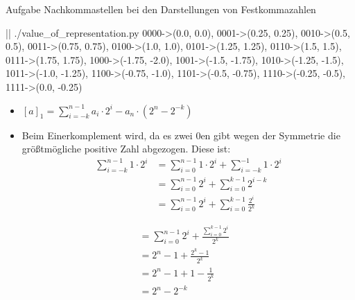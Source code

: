 \begin{frame}{Aufgabe \thesection}{Nachkommastellen bei den Darstellungen von Festkommazahlen\vspace{0.5cm}}
    \begin{requirementsnoinc}
    \end{requirementsnoinc}
    \begin{requirementsnoinc}
        \begin{terminal}
            |\prompt| ./value_of_representation.py
            {0000->(0.0, 0.0), 0001->(0.25, 0.25), 0010->(0.5, 0.5), 0011->(0.75, 0.75), 0100->(1.0, 1.0), 0101->(1.25, 1.25), 
            0110->(1.5, 1.5), 0111->(1.75, 1.75),  1000->(-1.75, -2.0), 1001->(-1.5, -1.75), 1010->(-1.25, -1.5), 
            1011->(-1.0, -1.25), 1100->(-0.75, -1.0), 1101->(-0.5, -0.75), 1110->(-0.25, -0.5), 1111->(0.0, -0.25)}        
        \end{terminal}
    \end{requirementsnoinc}

    \begin{solutionnoinc}
        \begin{itemize}
            \item $\displaystyle[a]_{1}=\textstyle{\sum_{i=-k}^{n-1}a_{i}\cdot2^{i}-a_{n}\cdot(2^{n}-2^{-k})}$
            \item Beim \alert{Einerkomplement} wird, da es zwei $0$en gibt wegen der Symmetrie die größtmögliche positive Zahl abgezogen. Diese ist: 
            \begin{align*}
            \sum_{i=-k}^{n-1}1\cdot2^{i} &= \sum_{i=0}^{n-1}1\cdot2^{i} + \sum_{i=-k}^{-1}1\cdot2^{i} \\
            &= \sum_{i=0}^{n-1}2^{i} + \sum_{i=0}^{k-1} 2^{i-k}\\
            &= \sum_{i=0}^{n-1}2^{i} + \sum_{i=0}^{k-1} \frac{2^{i}}{2^k}
            \end{align*}
        \end{itemize}
    \end{solutionnoinc}
    \begin{solutionnoinc}
\begin{align*}
      &= \sum_{i=0}^{n-1}2^{i} +  \frac{\sum_{i=0}^{k-1} 2^{i}}{2^k} \\
      & = 2^n-1+\frac{2^k-1}{2^k}\\
      & = 2^n-1+1-\frac{1}{2^k}\\
      & = 2^n-2^{-k}
      \end{align*}
    \end{solutionnoinc}
\end{frame}

